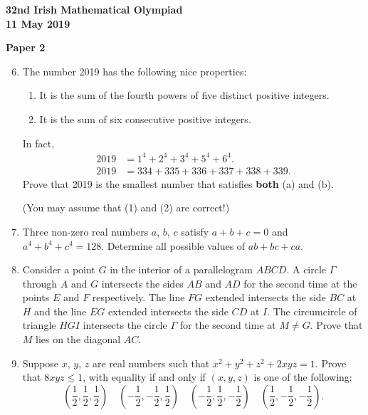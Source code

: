 \documentclass[12pt]{article}
\begin{document}
\newpage
\begin{center}
{\large\bfseries 32nd Irish Mathematical Olympiad\\11 May 2019}
\end{center}
\bigskip\noindent\textbf{Paper 2}\bigskip
\begin{enumerate}
\setcounter{enumi}{5}
\item The number 2019 has the following nice properties:
\begin{enumerate}
\item[(a)] It is the sum of the fourth powers of five distinct positive integers.
\item[(b)] It is the sum of six consecutive positive integers.
\end{enumerate}
In fact,
\begin{align}
2019 &= 1^4 + 2^4 + 3^4 + 5^4 + 6^4. \tag{1}\\
2019 &= 334 + 335 + 336 + 337 + 338 + 339. \tag{2}
\end{align}
Prove that 2019 is the smallest number that satisfies \textbf{both} (a) and (b).

(You may assume that (1) and (2) are correct!)

\item Three non-zero real numbers $a$, $b$, $c$ satisfy $a + b + c = 0$ and $a^4 + b^4 + c^4 = 128$. Determine all possible values of $ab + bc + ca$.

\item Consider a point $G$ in the interior of a parallelogram $ABCD$. A circle $\Gamma$ through $A$ and $G$ intersects the sides $AB$ and $AD$ for the second time at the points $E$ and $F$ respectively. The line $FG$ extended intersects the side $BC$ at $H$ and the line $EG$ extended intersects the side $CD$ at $I$. The circumcircle of triangle $HGI$ intersects the circle $\Gamma$ for the second time at $M \ne G$. Prove that $M$ lies on the diagonal $AC$.

\item Suppose $x$, $y$, $z$ are real numbers such that $x^2 + y^2 + z^2 + 2xyz = 1$. Prove that $8xyz \le 1$, with equality if and only if $(x, y, z)$ is one of the following:
\[
\left(\frac{1}{2}, \frac{1}{2}, \frac{1}{2}\right)\quad
\left(-\frac{1}{2}, -\frac{1}{2}, \frac{1}{2}\right)\quad
\left(-\frac{1}{2}, \frac{1}{2}, -\frac{1}{2}\right)\quad
\left(\frac{1}{2}, -\frac{1}{2}, -\frac{1}{2}\right).
\]


\end{enumerate}
\end{document}
